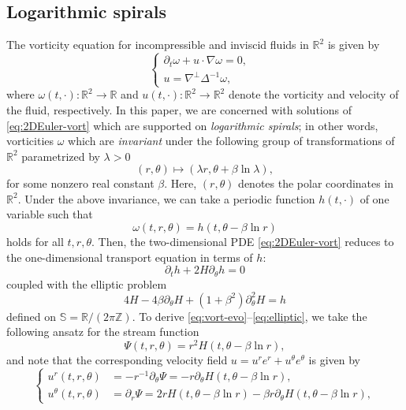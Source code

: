 \documentclass[JEP,XML,SOM,Unicode,NoFloatCountersInSection,published]{cedram}
\theoremstyle{plain}
\theoremstyle{definition}
\let\lap\Delta
\let\rd\partial
\let\nb\nabla
\let\bt\beta
\let\lmb\lambda
\let\tht\theta
\let\omg\omega
\newcommand{\bbR}{\mathbb R}
\newcommand{\bbS}{\mathbb S}
\newcommand{\bbZ}{\mathbb Z}
\begin{document}
\subsection{Logarithmic spirals}
The vorticity equation for incompressible and inviscid fluids in $\bbR^2$ is given by
\begin{equation}\label{eq:2DEuler-vort}
\left\{
\begin{aligned}
\rd_t\omg + u\cdot\nb \omg = 0, & \\
u = \nb^\perp \lap^{-1}\omg, &
\end{aligned}
\right.
\end{equation}
where $\omg(t,\cdot):\bbR^2\to\bbR$ and $u(t,\cdot):\bbR^2\to\bbR^{2}$ denote the vorticity and velocity of the fluid, respectively. In this paper, we are concerned with solutions of \eqref{eq:2DEuler-vort} which are supported on \textit{logarithmic spirals}; in other words, vorticities $\omg$ which are \textit{invariant} under the following group of transformations of $\bbR^{2}$ parametrized by $\lmb>0$
\begin{equation*}
(r,\tht) \mapsto (\lmb r, \tht + \beta\ln \lmb),
\end{equation*}
for some nonzero real constant $\bt$. Here, $(r,\tht)$ denotes the polar coordinates in $\bbR^2$. Under the above invariance, we can take a periodic function $h(t,\cdot)$ of one variable such that
\begin{equation}\label{eq:vort-homog-spi}
\omg(t,r,\tht) = h(t, \tht - \beta \ln r)
\end{equation}
holds for all $t, r, \tht$. Then, the two-dimensional PDE \eqref{eq:2DEuler-vort} reduces to the one-dimensional transport equation in terms of $h$:
\begin{equation}\label{eq:vort-evo}
\rd_t h + 2H \rd_\tht h = 0
\end{equation}
coupled with the elliptic problem
\begin{equation}\label{eq:elliptic}
4H-4\beta \partial_{\theta} H + (1+\beta^2)\partial^2_{\theta} H = h
\end{equation}
defined on $\bbS = \bbR/(2\pi\bbZ)$. To derive \eqref{eq:vort-evo}--\eqref{eq:elliptic}, we take the following ansatz for the stream function
\begin{equation}\label{eq:stream-homog}
\Psi(t,r,\tht) = r^2 H(t, \tht - \beta \ln r),
\end{equation}
and note that the corresponding velocity field $u = u^re^r+u^\tht e^\tht$ is given by
\begin{equation}\label{eq:vel-homog}
\left\{
\begin{aligned}
u^r(t,r,\tht) & = -r^{-1}\rd_\tht\Psi = - r\partial_{\theta} H(t, \tht - \beta \ln r), \\
u^\tht(t,r,\tht) & = \rd_r\Psi = 2rH(t, \tht - \beta \ln r) - \bt r \partial_{\theta} H(t, \tht - \beta \ln r),
\end{aligned}
\right.
\end{equation}
\end{document}
